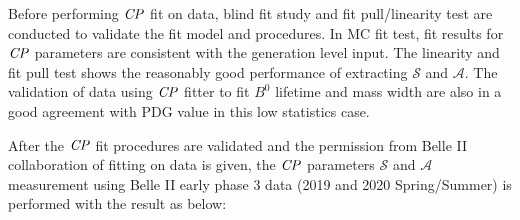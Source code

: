 \begin{comment}
Furthermore, the key to improve the precision of this measurement highly depends on the better signal reconstruction efficiency and vertex fitting. Both of these performances have been primarily studied to be either same competitive or outperformed with current Belle II condition compared to Belle. $K_S^0$ finder which guarantees the signal efficiency in the key role can be optimized by taking a better correction from data MC comparison in future. Besides, other algorithm such as deep neural network (DNN) may give a better discrimination but haven't been studied yet. One of the major concern is that tracking efficiency of $K_S^0$ is degraded by their long flight length, and it damages the advantage of having a larger detector volume in Belle II design motives. The expected boost in $K_S^0$ reconstruction is about 15\% which yields nearly 50\% more $B^0$ in this channel. Due to this issue, even with improved reconstruction strategies, the efficiency is not largely boosted as expected. This degradation may become even worse when higher background level is induced in future operation, the related improvement both from hardware and software is under construction. Thanks to extra PXD layers in Belle II, decay vertex now have a better constraint and smaller uncertainties. The resolution studies on \textit{CP} and tag side shows a clear improvement on vertexing accuracy. The vertex reconstruction still has a margin to improve after the full installation of PXD layer 2. The modeling of resolution function should also evolve with better understanding of vertexing performance along with data collection. The analysis presented in this thesis, including various strategies and supporting studies, paves a solid way for the time-dependent \textit{CP} violation measurement with Belle II data in the next few years. 
\end{comment}
 
Before performing $\it{CP}$ fit on data, blind fit study and fit pull/linearity test are conducted to validate the fit model and procedures. In MC fit test, fit results for $\it{CP}$ parameters are consistent with the generation level input. The linearity and fit pull test shows the reasonably good performance of extracting $\mathcal{S}$ and $\mathcal{A}$. 
The validation of data using $\it{CP}$ fitter to fit $B^0$ lifetime and mass width are also in a good agreement with PDG value in this low statistics case. 

After the $\it{CP}$ fit procedures are validated and the permission from Belle II collaboration of fitting on data is given, the $\it{CP}$ parameters $\mathcal{S}$ and $\mathcal{A}$ measurement using Belle II early phase 3 data (2019 and 2020 Spring/Summer) is performed with the result as below: 

